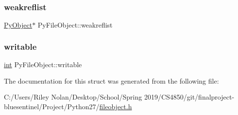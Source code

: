 \subsubsection{\texorpdfstring{weakreflist}{weakreflist}}
{\footnotesize\ttfamily \mbox{\hyperlink{_python27_2object_8h_aadc84ac7aed2cfa6f20c25f62bf3dac7}{Py\+Object}}$\ast$ Py\+File\+Object\+::weakreflist}

\mbox{\label{struct_py_file_object_aa2c3f3875dd70e147e6382f63a97a00b}} 
\subsubsection{\texorpdfstring{writable}{writable}}
{\footnotesize\ttfamily \mbox{\hyperlink{warnings_8h_a74f207b5aa4ba51c3a2ad59b219a423b}{int}} Py\+File\+Object\+::writable}



The documentation for this struct was generated from the following file\+:\begin{DoxyCompactItemize}
\item 
C\+:/\+Users/\+Riley Nolan/\+Desktop/\+School/\+Spring 2019/\+C\+S4850/git/finalproject-\/bluesentinel/\+Project/\+Python27/\mbox{\hyperlink{fileobject_8h}{fileobject.\+h}}\end{DoxyCompactItemize}
